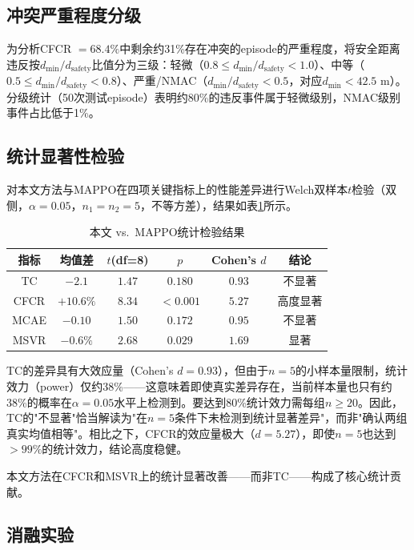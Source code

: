 \documentclass[12pt,a4paper,UTF8]{ctexart}
\begin{document}
\subsection{冲突严重程度分级}

为分析CFCR $=68.4\%$中剩余约31\%存在冲突的episode的严重程度，将安全距离违反按$d_{\min}/d_{\text{safety}}$比值分为三级：轻微（$0.8 \leq d_{\min}/d_{\text{safety}} < 1.0$）、中等（$0.5 \leq d_{\min}/d_{\text{safety}} < 0.8$）、严重/NMAC（$d_{\min}/d_{\text{safety}} < 0.5$，对应$d_{\min} < 42.5$ m）。分级统计（50次测试episode）表明约80\%的违反事件属于轻微级别，NMAC级别事件占比低于1\%。

\subsection{统计显著性检验}

对本文方法与MAPPO在四项关键指标上的性能差异进行Welch双样本$t$检验（双侧，$\alpha=0.05$，$n_1=n_2=5$，不等方差），结果如表\ref{tab:ttest}所示。

\begin{table}[H]
    \centering
    \caption{本文 vs.\ MAPPO统计检验结果}
    \label{tab:ttest}
    \begin{tabular}{|c|c|c|c|c|c|}
        \hline
        \textbf{指标} & \textbf{均值差} & \textbf{$t$(df=8)} & \textbf{$p$} & \textbf{Cohen's $d$} & \textbf{结论} \\
        \hline
        TC & $-2.1$ & $1.47$ & $0.180$ & $0.93$ & 不显著 \\
        CFCR & $+10.6\%$ & $8.34$ & $<0.001$ & $5.27$ & 高度显著 \\
        MCAE & $-0.10$ & $1.50$ & $0.172$ & $0.95$ & 不显著 \\
        MSVR & $-0.6\%$ & $2.68$ & $0.029$ & $1.69$ & 显著 \\
        \hline
    \end{tabular}
\end{table}

TC的差异具有大效应量（Cohen's $d=0.93$），但由于$n=5$的小样本量限制，统计效力（power）仅约38\%——这意味着即使真实差异存在，当前样本量也只有约38\%的概率在$\alpha=0.05$水平上检测到。要达到80\%统计效力需每组$n \geq 20$。因此，TC的"不显著"恰当解读为"在$n=5$条件下未检测到统计显著差异"，而非"确认两组真实均值相等"。相比之下，CFCR的效应量极大（$d=5.27$），即使$n=5$也达到$>99\%$的统计效力，结论高度稳健。

本文方法在CFCR和MSVR上的统计显著改善——而非TC——构成了核心统计贡献。

\subsection{消融实验}
\end{document}
